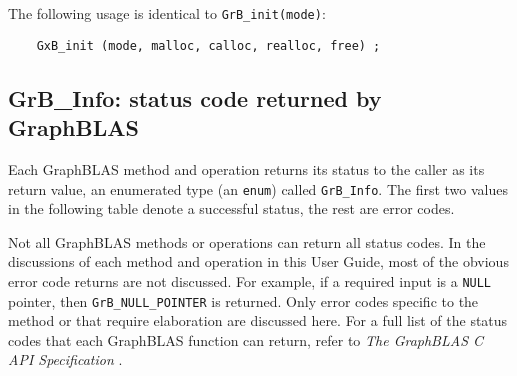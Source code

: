 \documentclass[12pt]{article}
\begin{document}
The following usage is identical to \verb'GrB_init(mode)':

    {\footnotesize
    \begin{verbatim}
    GxB_init (mode, malloc, calloc, realloc, free) ; \end{verbatim}}

\newpage
\subsection{{\sf GrB\_Info:} status code returned by GraphBLAS} %
\label{info}

Each GraphBLAS method and operation returns its status to the caller as its
return value, an enumerated type (an \verb'enum') called \verb'GrB_Info'.  The
first two values in the following table denote a successful status, the rest
are error codes.

Not all GraphBLAS methods or operations can return all status codes.
In the discussions of each method and operation in this User Guide, most of the
obvious error code returns are not discussed.  For example, if a required input
is a \verb'NULL' pointer, then \verb'GrB_NULL_POINTER' is returned.  Only error
codes specific to the method or that require elaboration are discussed here.
For a full list of the status codes that each GraphBLAS function can return,
refer to {\em The GraphBLAS C API Specification} \cite{spec,spec2}.
\end{document}
